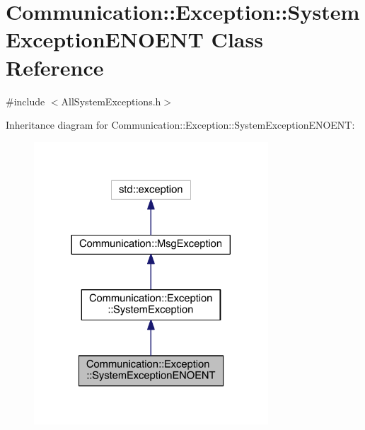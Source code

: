 \hypertarget{class_communication_1_1_exception_1_1_system_exception_e_n_o_e_n_t}{}\section{Communication\+:\+:Exception\+:\+:System\+Exception\+E\+N\+O\+E\+N\+T Class Reference}
\label{class_communication_1_1_exception_1_1_system_exception_e_n_o_e_n_t}


{\ttfamily \#include $<$All\+System\+Exceptions.\+h$>$}



Inheritance diagram for Communication\+:\+:Exception\+:\+:System\+Exception\+E\+N\+O\+E\+N\+T\+:\nopagebreak
\begin{figure}[H]
\begin{center}
\leavevmode
\includegraphics[width=248pt]{class_communication_1_1_exception_1_1_system_exception_e_n_o_e_n_t__inherit__graph}
\end{center}
\end{figure}


